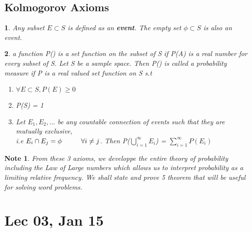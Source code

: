 \documentclass[11pt]{article}
\newtheorem*{note}{Note}
\newtheorem{definition}{\framebox{DEF}}[section]
\newcommand\tab[1][1cm]{\hspace*{#1}}
\begin{document}
            \subsection{Kolmogorov Axioms}
                \begin{definition}
                    Any subset $E \subset S $ is defined as an \textbf{\textit{event}}.
                     The empty set $\phi \subset S$ is also an event.
                \end{definition}
                
                \begin{definition}
                    a function P() is a set function on the subset of S if P(A) is a real number for every subset of S.
                    Let S be a sample space. Then P() is called a probability measure if P is a real valued set function on S s.t
                    \begin{enumerate}
                        \item $\forall E \subset S, P(E) \geq 0$
                        \item P(S) = 1
                        \item Let $E_1, E_2, ...$ be any countable connection of events such that they are mutually exclusive, 
                        \\i.e $E_i \cap E_j = \phi \tab \forall i\neq j$. 
                         Then P($\bigcup\limits_{i=1}^{\infty}E_i$) = $\sum\limits_{i=1}^{\infty}P(E_i)$ 
                    \end{enumerate}
                \end{definition}
                \begin{note}
                    From these 3 axioms, we developpe the entire theory of probability including the Law of Large numbers 
                    which allows us to interpret probability as a limiting relative frequency. 
                    We shall state and prove 5 theorem that will be useful for solving word problems.
                \end{note}
                \newpage
    \section{Lec 03, Jan 15}
\end{document}
